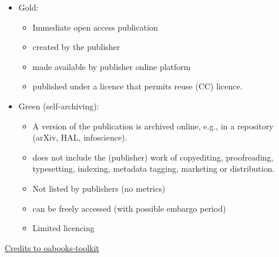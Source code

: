 \documentclass[10pt,compress,serif]{beamer}
\begin{document}

\begin{frame}[t]%
 \vskip1cm%

 
 \begin{itemize}
 \item Gold:
   \begin{itemize}
   \item Immediate open access publication
   \item created by the publisher
   \item made available by publisher online platform
   \item published under a licence that permits reuse (CC) licence.
   \end{itemize}
 \item Green (self-archiving):
   \begin{itemize}
   \item A version of the publication is archived online, e.g., in a repository (arXiv, HAL, infoscience).
   \item does not include the (publisher) work of copyediting, proofreading, typesetting, indexing, metadata tagging, marketing or distribution.
   \item Not listed by publishers (no metrics)
   \item can be freely accessed (with possible embargo period)
   \item Limited licencing
   \end{itemize}


 \end{itemize}
 \vfill
\href{ https://oabooks-toolkit.org/lifecycle/article/13868103-green-gold-diamond-different-models-for-open-access-books}{Credits to oabooks-toolkit}

\end{frame} 
\end{document}
